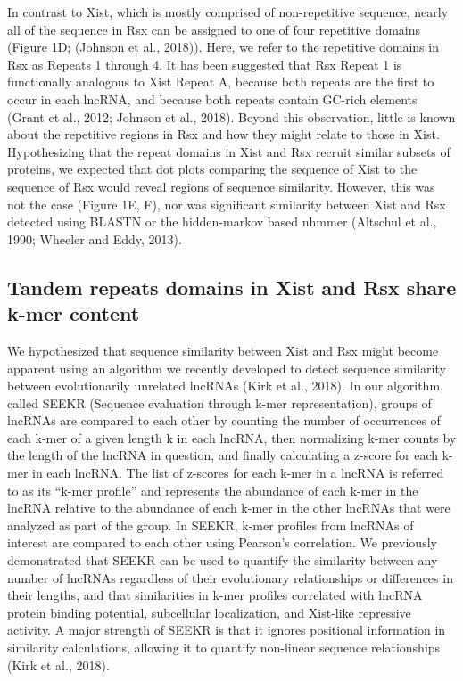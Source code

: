 In contrast to Xist, which is mostly comprised of non-repetitive sequence, nearly all of the sequence in Rsx can be assigned to one of four repetitive domains (Figure 1D; (Johnson et al., 2018)). Here, we refer to the repetitive domains in Rsx as Repeats 1 through 4. It has been suggested that Rsx Repeat 1 is functionally analogous to Xist Repeat A, because both repeats are the first to occur in each lncRNA, and because both repeats contain GC-rich elements (Grant et al., 2012; Johnson et al., 2018). Beyond this observation, little is known about the repetitive regions in Rsx and how they might relate to those in Xist. Hypothesizing that the repeat domains in Xist and Rsx recruit similar subsets of proteins, we expected that dot plots comparing the sequence of Xist to the sequence of Rsx would reveal regions of sequence similarity. However, this was not the case (Figure 1E, F), nor was significant similarity between Xist and Rsx detected using BLASTN or the hidden-markov based nhmmer (Altschul et al., 1990; Wheeler and Eddy, 2013). 

\subsection{Tandem repeats domains in Xist and Rsx share k-mer content}
We hypothesized that sequence similarity between Xist and Rsx might become apparent using an algorithm we recently developed to detect sequence similarity between evolutionarily unrelated lncRNAs (Kirk et al., 2018). In our algorithm, called SEEKR (Sequence evaluation through k-mer representation), groups of lncRNAs are compared to each other by counting the number of occurrences of each k-mer of a given length k in each lncRNA, then normalizing k-mer counts by the length of the lncRNA in question, and finally calculating a z-score for each k-mer in each lncRNA. The list of z-scores for each k-mer in a lncRNA is referred to as its “k-mer profile” and represents the abundance of each k-mer in the lncRNA relative to the abundance of each k-mer in the other lncRNAs that were analyzed as part of the group. In SEEKR, k-mer profiles from lncRNAs of interest are compared to each other using Pearson’s correlation. We previously demonstrated that SEEKR can be used to quantify the similarity between any number of lncRNAs regardless of their evolutionary relationships or differences in their lengths, and that similarities in k-mer profiles correlated with lncRNA protein binding potential, subcellular localization, and Xist-like repressive activity. A major strength of SEEKR is that it ignores positional information in similarity calculations, allowing it to quantify non-linear sequence relationships (Kirk et al., 2018). 


